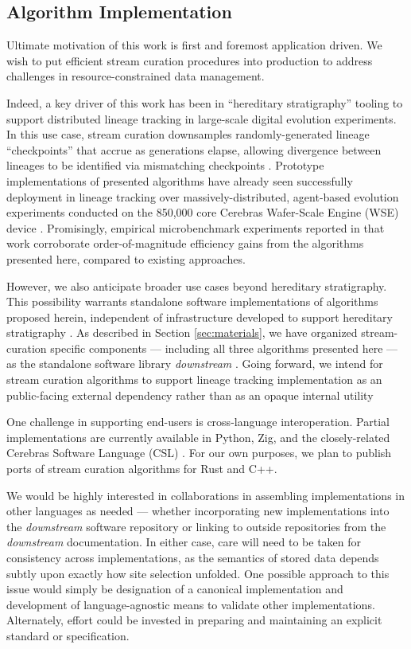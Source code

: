 \subsection{Algorithm Implementation}

Ultimate motivation of this work is first and foremost application driven.
We wish to put efficient stream curation procedures into production to address challenges in resource-constrained data management.

Indeed, a key driver of this work has been in ``hereditary stratigraphy'' tooling to support distributed lineage tracking in large-scale digital evolution experiments.
In this use case, stream curation downsamples randomly-generated lineage ``checkpoints'' that accrue as generations elapse, allowing divergence between lineages to be identified via mismatching checkpoints \citep{moreno2022hereditary}.
Prototype implementations of presented algorithms have already seen successfully deployment in lineage tracking over massively-distributed, agent-based evolution experiments conducted on the 850,000 core Cerebras Wafer-Scale Engine (WSE) device \citep{moreno2024trackable}.
Promisingly, empirical microbenchmark experiments reported in that work corroborate order-of-magnitude efficiency gains from the algorithms presented here, compared to existing approaches.

However, we also anticipate broader use cases beyond hereditary stratigraphy.
This possibility warrants standalone software implementations of algorithms proposed herein, independent of infrastructure developed to support hereditary stratigraphy \citep{moreno2022hstrat}.
As described in Section \ref{sec:materials}, we have organized stream-curation specific components --- including all three algorithms presented here --- as the standalone software library \textit{downstream} \citep{moreno2024downstream}.
Going forward, we intend for stream curation algorithms to support lineage tracking implementation as an public-facing external dependency rather than as an opaque internal utility \citep{moreno2022hstrat}

One challenge in supporting end-users is cross-language interoperation.
Partial implementations are currently available in Python, Zig, and the closely-related Cerebras Software Language (CSL) \citep{moreno2024hsurf,moreno2024downstream,moreno2024wse}.
For our own purposes, we plan to publish ports of stream curation algorithms for Rust and C++.

We would be highly interested in collaborations in assembling implementations in other languages as needed --- whether incorporating new implementations into the \textit{downstream} software repository or linking to outside repositories from the \textit{downstream} documentation.
In either case, care will need to be taken for consistency across implementations, as the semantics of stored data depends subtly upon exactly how site selection unfolded.
One possible approach to this issue would simply be designation of a canonical implementation and development of language-agnostic means to validate other implementations.
Alternately, effort could be invested in preparing and maintaining an explicit standard or specification.
